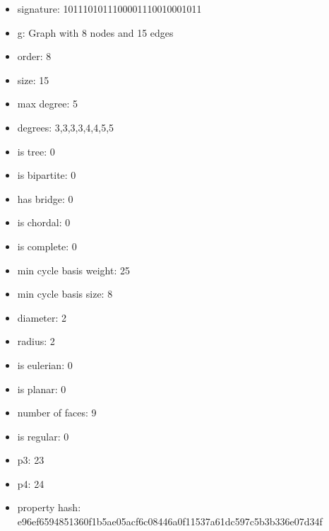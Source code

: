 \begin{itemize}
\item signature: 1011101011100001110010001011
\item g: Graph with 8 nodes and 15 edges
\item order: 8
\item size: 15
\item max degree: 5
\item degrees: 3,3,3,3,4,4,5,5
\item is tree: 0
\item is bipartite: 0
\item has bridge: 0
\item is chordal: 0
\item is complete: 0
\item min cycle basis weight: 25
\item min cycle basis size: 8
\item diameter: 2
\item radius: 2
\item is eulerian: 0
\item is planar: 0
\item number of faces: 9
\item is regular: 0
\item p3: 23
\item p4: 24
\item property hash: e96ef6594851360f1b5ae05acf6c08446a0f11537a61dc597c5b3b336e07d34f
\end{itemize}
\newpage
\begin{figure}
\end{figure}
